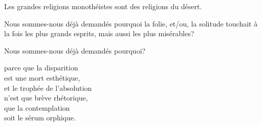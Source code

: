 {{\begin{center}
\begin{minipage}{0.8\linewidth}
\begin{center}
            \vspace{1cm}
            Les grandes religions monothéistes sont des
            religions du désert.

            \vspace{1cm}
            Nous sommes-nous déjà demandés pourquoi
            la folie, et/ou, la solitude touchait à la fois
            les plus grands esprits, mais aussi les
            plus misérables?

            \vspace{1cm}
            Nous sommes-nous déjà demandés pourquoi?
        \end{center}
        
    \end{minipage}
    \vspace*{\fill}
\end{center}
}{
\begin{center}
    \vspace*{\fill}
    \begin{minipage}{0.8\linewidth}
    
        \begin{center}
            parce que la disparition\\
			est une mort esthétique,\\

            \vspace{1cm}
            et le trophée de l'absolution\\
			n'est que brève rhétorique,\\

            \vspace{1cm}
			que la contemplation\\
			soit le sérum orphique.
        \end{center}
        
    \end{minipage}
    \vspace*{\fill}
\end{center}
}}

\newpage
\fi

